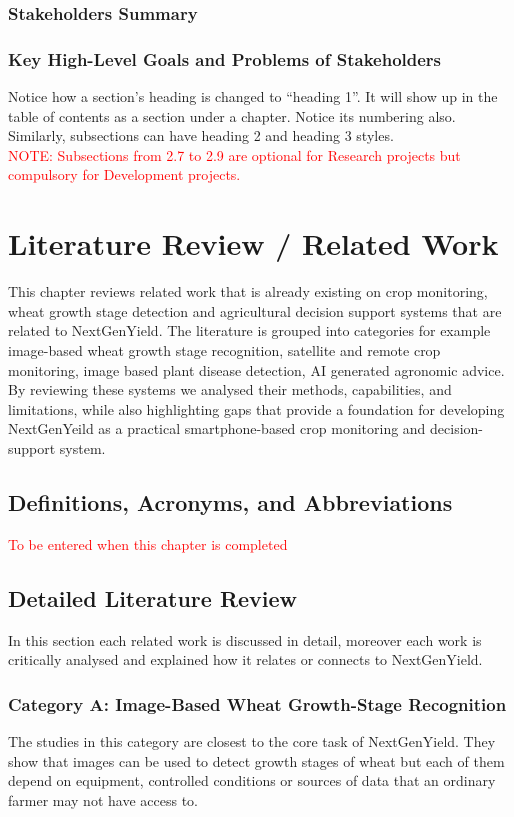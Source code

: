 \documentclass{FastFyp}
\begin{document}
\subsection{Stakeholders Summary}
\subsection{Key High-Level Goals and Problems of Stakeholders}
Notice how a section’s heading is changed to “heading 1”.  It will show up in the table of contents as a section under a chapter.  Notice its numbering also. Similarly, subsections can have heading 2 and heading 3 styles.\\
\textcolor{red}{NOTE: Subsections from 2.7 to 2.9 are optional for Research projects but compulsory for Development projects.}

\chapter{Literature Review / Related Work}
This chapter reviews related work that is already existing on crop monitoring, wheat growth stage detection and agricultural decision support systems that are related to NextGenYield. The literature is grouped into categories for example image-based wheat growth stage recognition, satellite and remote crop monitoring, image based plant disease detection, AI generated agronomic advice. By reviewing these systems we analysed their methods, capabilities, and limitations, while also highlighting gaps that provide a foundation for developing NextGenYeild as a practical smartphone-based crop monitoring and decision-support system. 
\section{Definitions, Acronyms, and Abbreviations}
\textcolor{red}{To be entered when this chapter is completed} 
\section{Detailed Literature Review} 
In this section each related work is discussed in detail, moreover each work is critically analysed and explained how it relates or connects to NextGenYield.
\subsection{Category A: Image-Based Wheat Growth-Stage Recognition}

The studies in this category are closest to the core task of NextGenYield. They show that images can be used to detect growth stages of wheat but each of them depend on equipment, controlled conditions or sources of data that an ordinary farmer may not have access to.
\end{document}
